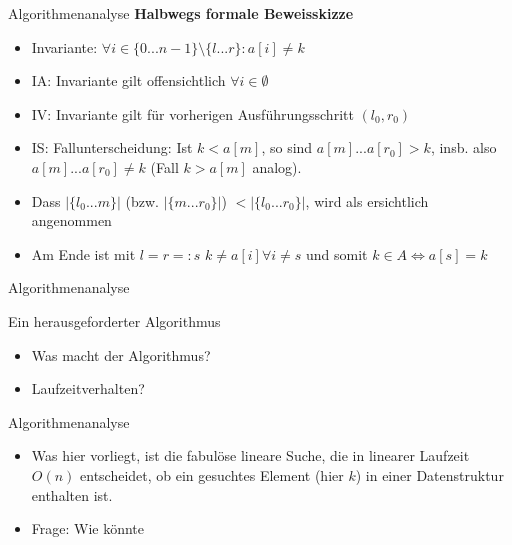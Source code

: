 \begin{frame}{Algorithmenanalyse}
	\textbf{Halbwegs formale Beweisskizze} \\[0,125cm]
	\pause
	\begin{itemize}
		\item Invariante: $\forall i \in \{0 ... n-1\} \setminus \{l ... r\}: a[i] \neq k$
		\pause
		\item IA: Invariante gilt offensichtlich $\forall i \in \emptyset$
		\pause
		\item IV: Invariante gilt für vorherigen Ausführungsschritt $(l_0, r_0)$
		\pause
		\item IS: Fallunterscheidung: Ist $k < a[m]$, so sind $a[m] ... a[r_0] > k$, insb. also $a[m] ... a[r_0] \neq k$ (Fall $k > a[m]$ analog).
		\pause
		\item Dass $ | \{l_0 ... m\} | $ (bzw. $ | \{m ... r_0\} | $) $ < | \{l_0 ... r_0\} | $, wird als ersichtlich angenommen
		\pause
		\item Am Ende ist mit $l = r =: s$ $k \neq a[i] \forall i \neq s$ und somit $k \in A \Leftrightarrow a[s] = k$
	\end{itemize}
\end{frame}

\begin{frame}{Algorithmenanalyse}
	\begin{exampleblock}{Ein herausgeforderter Algorithmus}
		\begin{algorithm}[H]
			\DontPrintSemicolon
			\footnotesize
		\end{algorithm}
	\end{exampleblock}
	\begin{itemize}
		\item Was macht der Algorithmus?
		\item Laufzeitverhalten?
	\end{itemize}
\end{frame}

\begin{frame}{Algorithmenanalyse}
	\begin{itemize}
		\item Was hier vorliegt, ist die fabulöse lineare Suche, die in linearer Laufzeit $O(n)$ entscheidet, ob ein gesuchtes Element (hier $k$) in einer Datenstruktur enthalten ist.
		\pause
		\item Frage: Wie könnte 
	\end{itemize}
\end{frame}

